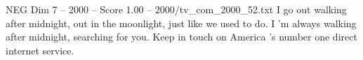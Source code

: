 \begin{textsample}{NEG Dim 7 – 2000 – Score 1.00 – 2000/tv\_com\_2000\_52.txt}  \label{ex:f7_neg_043}
I go out walking after midnight, out in the moonlight, just like we used to do.
I 'm always walking after midnight, searching for you.
Keep in touch on America 's number one direct internet service.

\end{textsample}
